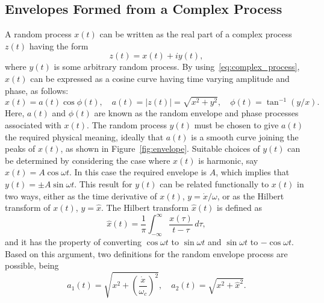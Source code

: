 \documentclass[12pt]{article}
\theoremstyle{plain}
\theoremstyle{definition}
\theoremstyle{remark}
\begin{document}
\subsection{Envelopes Formed from a Complex Process}
A random process $x(t)$ can be written as the real part of a complex process $z(t)$ having the form
\begin{equation}
    z(t) = x(t) + i y(t),
    \label{eq:complex_process}
\end{equation}
where $y(t)$ is some arbitrary random process. By using~\eqref{eq:complex_process}, $x(t)$ can be expressed as a cosine curve having time varying amplitude and phase, as follows:
\begin{equation}
    x(t) = a(t) \cos \phi(t), \quad a(t) = |z(t)| = \sqrt{x^2 + y^2}, \quad \phi(t) = \tan^{-1}(y/x).
    \label{eq:amp_phase}
\end{equation}
Here, $a(t)$ and $\phi(t)$ are known as the random envelope and phase processes associated with $x(t)$. The random process $y(t)$ must be chosen to give $a(t)$ the required physical meaning, ideally that $a(t)$ is a smooth curve joining the peaks of $x(t)$, as shown in Figure~\ref{fig:envelope}. Suitable choices of $y(t)$ can be determined by considering the case where $x(t)$ is harmonic, say $x(t) = A \cos \omega t$. In this case the required envelope is $A$, which implies that $y(t) = \pm A \sin \omega t$. This result for $y(t)$ can be related functionally to $x(t)$ in two ways, either as the time derivative of $x(t)$, $y = \dot{x}/\omega$, or as the Hilbert transform of $x(t)$, $y = \hat{x}$. The Hilbert transform $\hat{x}(t)$ is defined as~\cite{papoulis1984}
\begin{equation}
    \hat{x}(t) = \frac{1}{\pi} \int_{-\infty}^{\infty} \frac{x(\tau)}{t - \tau} \, d\tau,
    \label{eq:hilbert}
\end{equation}
and it has the property of converting $\cos \omega t$ to $\sin \omega t$ and $\sin \omega t$ to $-\cos \omega t$. Based on this argument, two definitions for the random envelope process are possible, being
\begin{equation}
    a_1(t) = \sqrt{x^2 + \left( \frac{\dot{x}}{\omega_c} \right)^2}, \quad a_2(t) = \sqrt{x^2 + \hat{x}^2}.
    \label{eq:envelope_defs}
\end{equation}
\end{document}
